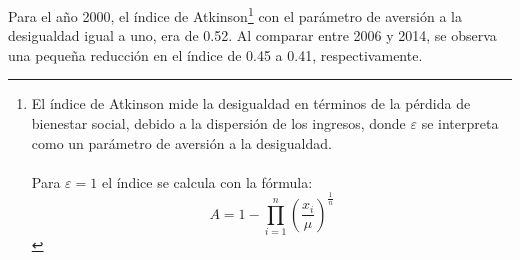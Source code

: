  Para el año 2000, el índice de Atkinson\footnote{El índice de Atkinson mide la desigualdad en términos de la pérdida de bienestar social, debido a la dispersión de los ingresos, donde $\varepsilon$ se interpreta como un parámetro de aversión a la desigualdad.\\\\ 
	Para $\varepsilon = \mbox{1} $ el índice se calcula con la fórmula: 
	\[ A =  1 - \prod_{i=1}^{n}\left(\frac{x_i}{\mu}
\right)^{\frac{1}{n}}   \]} con el parámetro de aversión a la desigualdad igual a uno, era de 0.52. Al comparar entre 2006 y 2014, se observa una pequeña reducción en el índice de 0.45 a 0.41, respectivamente.